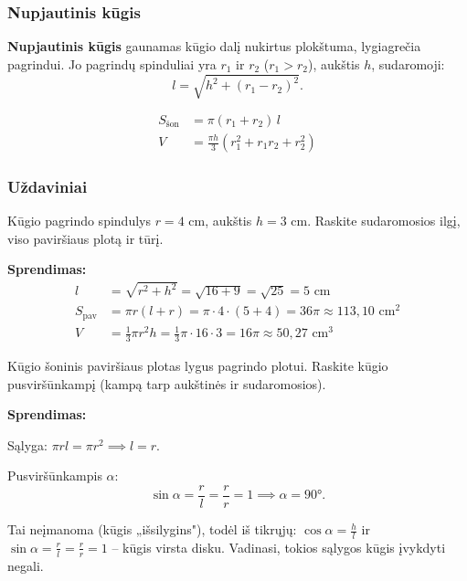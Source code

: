 \subsubsection*{Nupjautinis kūgis}

\begin{definition}
\textbf{Nupjautinis kūgis} gaunamas kūgio dalį nukirtus plokštuma, lygiagrečia pagrindui. Jo pagrindų spinduliai yra $r_1$ ir $r_2$ ($r_1 > r_2$), aukštis $h$, sudaromoji:
\[
    l = \sqrt{h^2 + (r_1 - r_2)^2}.
\]
\end{definition}

\begin{tcolorbox}[title=Nupjautinio kūgio formulės, colback=green!5!white, colframe=green!60!black]
\begin{align}
    S_{\text{šon}} &= \pi (r_1 + r_2)\, l \\
    V &= \frac{\pi h}{3}\left(r_1^2 + r_1 r_2 + r_2^2\right)
\end{align}
\end{tcolorbox}

\subsubsection*{Uždaviniai}

\begin{exercise}
Kūgio pagrindo spindulys $r = 4$ cm, aukštis $h = 3$ cm. Raskite sudaromosios ilgį, viso paviršiaus plotą ir tūrį.

\textbf{Sprendimas:}
\begin{align*}
    l &= \sqrt{r^2 + h^2} = \sqrt{16 + 9} = \sqrt{25} = 5 \text{ cm} \\
    S_{\text{pav}} &= \pi r(l + r) = \pi \cdot 4 \cdot (5 + 4) = 36\pi \approx 113{,}10 \text{ cm}^2 \\
    V &= \frac{1}{3}\pi r^2 h = \frac{1}{3}\pi \cdot 16 \cdot 3 = 16\pi \approx 50{,}27 \text{ cm}^3
\end{align*}
\end{exercise}

\begin{exercise}
Kūgio šoninis paviršiaus plotas lygus pagrindo plotui. Raskite kūgio pusviršūnkampį (kampą tarp aukštinės ir sudaromosios).

\textbf{Sprendimas:}

Sąlyga: $\pi r l = \pi r^2 \implies l = r$.

Pusviršūnkampis $\alpha$:
\[
    \sin\alpha = \frac{r}{l} = \frac{r}{r} = 1 \implies \alpha = 90°.
\]

Tai neįmanoma (kūgis „išsilygins"), todėl iš tikrųjų: $\cos\alpha = \frac{h}{l}$ ir $\sin\alpha = \frac{r}{l} = \frac{r}{r} = 1$ – kūgis virsta disku. Vadinasi, tokios sąlygos kūgis įvykdyti negali.
\end{exercise}


